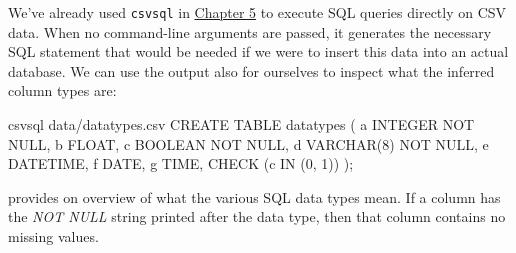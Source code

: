 \documentclass[
]{book}
\newenvironment{Shaded}{\begin{snugshade}}{\end{snugshade}}
\newcommand{\ExtensionTok}[1]{#1}
\newcommand{\NormalTok}[1]{#1}
\theoremstyle{definition}
\theoremstyle{definition}
\theoremstyle{definition}
\theoremstyle{remark}
\begin{document}
We've already used \texttt{csvsql} in \protect\hyperlink{chapter-5-scrubbing-data}{Chapter 5} to execute SQL queries directly on CSV data. When no command-line arguments are passed, it generates the necessary SQL statement that would be needed if we were to insert this data into an actual database. We can use the output also for ourselves to inspect what the inferred column types are:

\begin{Shaded}
\begin{Highlighting}[]
\ExtensionTok{csvsql}\NormalTok{ data/datatypes.csv}
\ExtensionTok{CREATE}\NormalTok{ TABLE datatypes (}
        \ExtensionTok{a}\NormalTok{ INTEGER NOT NULL,}
        \ExtensionTok{b}\NormalTok{ FLOAT,}
        \ExtensionTok{c}\NormalTok{ BOOLEAN NOT NULL,}
        \ExtensionTok{d}\NormalTok{ VARCHAR(8) }\ExtensionTok{NOT}\NormalTok{ NULL,}
        \ExtensionTok{e}\NormalTok{ DATETIME,}
        \ExtensionTok{f}\NormalTok{ DATE,}
        \ExtensionTok{g}\NormalTok{ TIME,}
        \ExtensionTok{CHECK}\NormalTok{ (c IN (0, 1))}
\NormalTok{);}
\end{Highlighting}
\end{Shaded}

provides on overview of what the various SQL data types mean. If a column has the \emph{NOT NULL} string printed after the data type, then that column contains no missing values.
\end{document}
